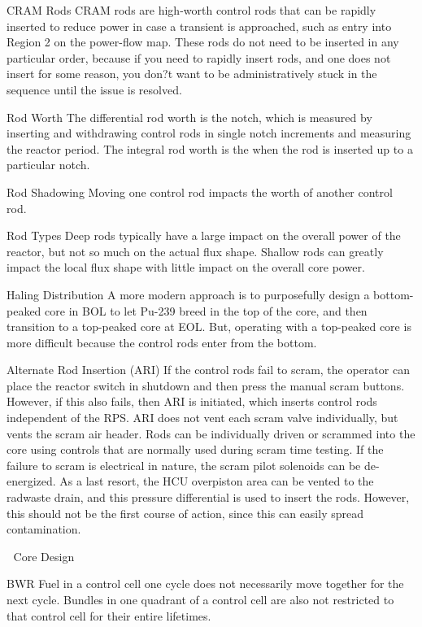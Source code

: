 \documentclass[10pt]{article}
\begin{document}
CRAM Rods
CRAM rods are high-worth control rods that can be rapidly inserted to reduce power in case a transient is approached, such as entry into Region 2 on the power-flow map. These rods do not need to be inserted in any particular order, because if you need to rapidly insert rods, and one does not insert for some reason, you don?t want to be administratively stuck in the sequence until the issue is resolved. 

Rod Worth
The differential rod worth is the notch, which is measured by inserting and withdrawing control rods in single notch increments and measuring the reactor period. The integral rod worth is the  when the rod is inserted up to a particular notch. 

Rod Shadowing
Moving one control rod impacts the worth of another control rod. 

Rod Types
Deep rods typically have a large impact on the overall power of the reactor, but not so much on the actual flux shape. Shallow rods can greatly impact the local flux shape with little impact on the overall core power. 

Haling Distribution
A more modern approach is to purposefully design a bottom-peaked core in BOL to let Pu-239 breed in the top of the core, and then transition to a top-peaked core at EOL. But, operating with a top-peaked core is more difficult because the control rods enter from the bottom. 

Alternate Rod Insertion (ARI)
If the control rods fail to scram, the operator can place the reactor switch in shutdown and then press the manual scram buttons. However, if this also fails, then ARI is initiated, which inserts control rods independent of the RPS. ARI does not vent each scram valve individually, but vents the scram air header. Rods can be individually driven or scrammed into the core using controls that are normally used during scram time testing. If the failure to scram is electrical in nature, the scram pilot solenoids can be de-energized. As a last resort, the HCU overpiston area can be vented to the radwaste drain, and this pressure differential is used to insert the rods. However, this should not be the first course of action, since this can easily spread contamination. 


Core Design

BWR
Fuel in a control cell one cycle does not necessarily move together for the next cycle. Bundles in one quadrant of a control cell are also not restricted to that control cell for their entire lifetimes. 
\end{document}
